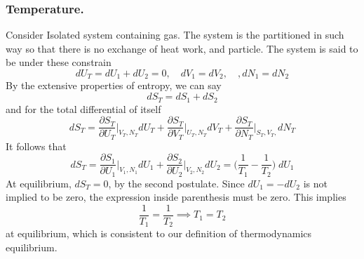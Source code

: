 \documentclass[../../../Main.tex]{subfiles}
\begin{document}
\subsubsection*{Temperature.} Consider Isolated system containing gas. The system is the partitioned in such way so that there is no exchange of heat work, and particle. The system is said to be under these constrain
\begin{equation*}
    dU_T=dU_1+dU_2=0, \quad dV_1 =dV_2, \quad, dN_1=dN_2
\end{equation*}
By the extensive properties of entropy, we can say 
\begin{equation*}
    dS_T=dS_1+dS_2
\end{equation*}
and for the total differential of itself
\begin{equation*}
    dS_T= \frac{\partial S_T}{\partial U_T}\bigg|_{V_T,N_T} dU_T + \frac{ \partial S_T}{\partial V_T}\bigg|_{U_T,N_T} dV_T+ \frac{\partial S_T}{\partial N_T}\bigg|_{S_T,V_T,}dN_T
\end{equation*}
It follows that 
\begin{equation*}
    dS_T=\frac{\partial S_1}{\partial U_1}\bigg|_{V_1,N_1} dU_1 + \frac{\partial S_2}{\partial U_2}\bigg|_{V_2,N_2} dU_2  = \biggl(\frac{1}{T_1}-\frac{1}{T_2}\biggr)\;dU_1
\end{equation*}
At equilibrium, $dS_T=0$, by the second postulate. Since $dU_1=-dU_2$ is not implied to be zero, the expression inside parenthesis must be zero. This implies
\begin{equation*}
    \frac{1}{T_1}=\frac{1 }{T_2}\implies T_1=T_2
\end{equation*}
at equilibrium, which is consistent to our definition of thermodynamics equilibrium.
\end{document}
